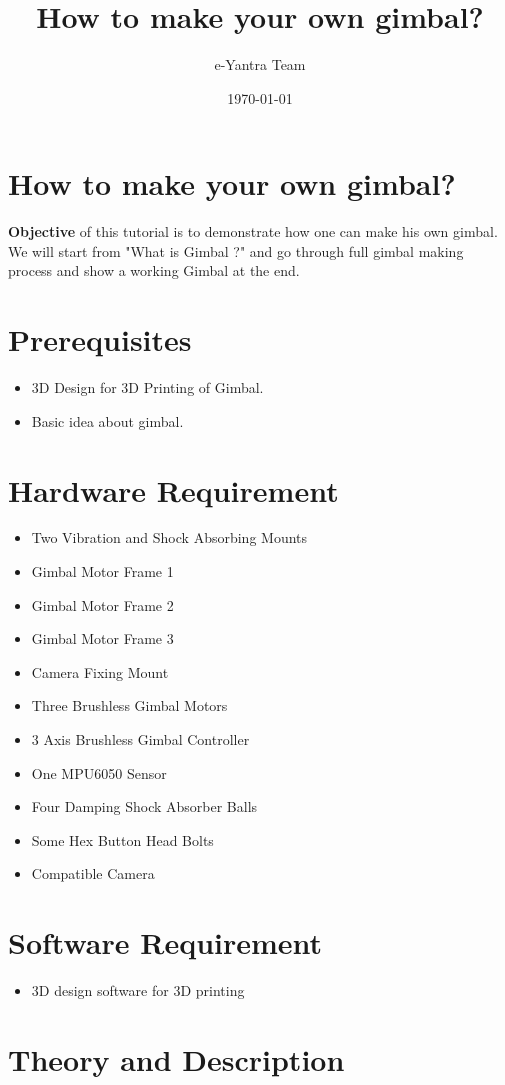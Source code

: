 \documentclass[11pt,a4paper]{article}
\title{How to make your own gimbal?}
\author{e-Yantra Team}
\date{\today}
\begin{document}
	\maketitle
	\newpage
	\tableofcontents
	\newpage
	\section{How to make your own gimbal?}
	\textbf{Objective} of this tutorial is to demonstrate how one can make his own gimbal. We will start from "What is Gimbal ?" and go through full gimbal making process and show a working Gimbal at the end.
	\section{Prerequisites}
	\begin{itemize}
		\item 3D Design for 3D Printing of Gimbal.
		\item Basic idea about gimbal.
	\end{itemize}
	\section{Hardware Requirement}
	\begin{itemize}
		\item Two Vibration and Shock Absorbing Mounts
		\item Gimbal Motor Frame 1
		\item Gimbal Motor Frame 2
		\item Gimbal Motor Frame 3
		\item Camera Fixing Mount
		\item Three Brushless Gimbal Motors
		\item 3 Axis Brushless Gimbal Controller
		\item One MPU6050  Sensor
		\item Four Damping Shock Absorber Balls
		\item Some Hex Button Head Bolts
		\item Compatible Camera
	\end{itemize}
	\section{Software Requirement}
	\begin{itemize}
		\item 3D design software for 3D printing
	\end{itemize}
	\section{Theory and Description}
		
\end{document}
